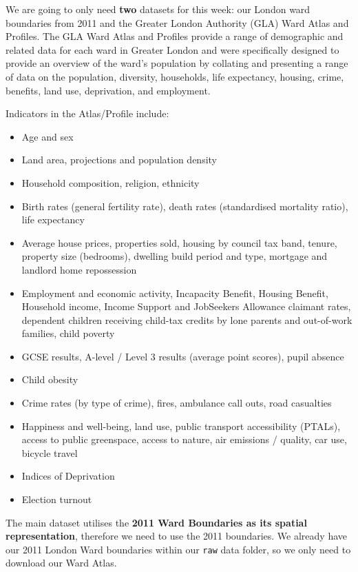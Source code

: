 \documentclass[
]{book}
\providecommand{\tightlist}{%
  \setlength{\itemsep}{0pt}\setlength{\parskip}{0pt}}
\begin{document}
We are going to only need \textbf{two} datasets for this week: our London ward boundaries from 2011 and the Greater London Authority (GLA) Ward Atlas and Profiles. The GLA Ward Atlas and Profiles provide a range of demographic and related data for each ward in Greater London and were specifically designed to provide an overview of the ward's population by collating and presenting a range of data on the population, diversity, households, life expectancy, housing, crime, benefits, land use, deprivation, and employment.

Indicators in the Atlas/Profile include:

\begin{itemize}
\tightlist
\item
  Age and sex
\item
  Land area, projections and population density
\item
  Household composition, religion, ethnicity
\item
  Birth rates (general fertility rate), death rates (standardised mortality ratio), life expectancy
\item
  Average house prices, properties sold, housing by council tax band, tenure, property size (bedrooms), dwelling build period and type, mortgage and landlord home repossession
\item
  Employment and economic activity, Incapacity Benefit, Housing Benefit, Household income, Income Support and JobSeekers Allowance claimant rates, dependent children receiving child-tax credits by lone parents and out-of-work families, child poverty
\item
  GCSE results, A-level / Level 3 results (average point scores), pupil absence
\item
  Child obesity
\item
  Crime rates (by type of crime), fires, ambulance call outs, road casualties
\item
  Happiness and well-being, land use, public transport accessibility (PTALs), access to public greenspace, access to nature, air emissions / quality, car use, bicycle travel
\item
  Indices of Deprivation
\item
  Election turnout
\end{itemize}

The main dataset utilises the \textbf{2011 Ward Boundaries as its spatial representation}, therefore we need to use the 2011 boundaries. We already have our 2011 London Ward boundaries within our \texttt{raw} data folder, so we only need to download our Ward Atlas.
\end{document}
